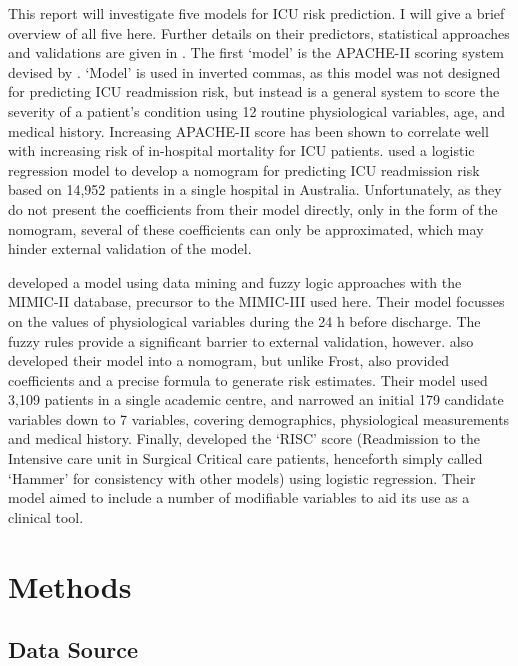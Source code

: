 \documentclass[onecolumn]{article}
\begin{document}
This report will investigate five models for ICU risk prediction. I will give a brief overview of all five here. Further details on their predictors, statistical approaches and validations are given in .
The first `model' is the APACHE-II scoring system devised by \cite{Knaus1985}. `Model' is used in inverted commas, as this model was not designed for predicting ICU readmission risk, but instead is a general system to score the severity of a patient's condition using 12 routine physiological variables, age, and medical history. Increasing APACHE-II score has been shown to correlate well with increasing risk of in-hospital mortality for ICU patients. 
\cite{Frost2010} used a logistic regression model to develop a nomogram for predicting ICU readmission risk based on 14,952 patients in a single hospital in Australia. Unfortunately, as they do not present the coefficients from their model directly, only in the form of the nomogram, several of these coefficients can only be approximated, which may hinder external validation of the model.

\cite{Fialho2012} developed a model using data mining and fuzzy logic approaches with the MIMIC-II database, precursor to the MIMIC-III used here. Their model focusses on the values of physiological variables during the 24 h before discharge. The fuzzy rules provide a significant barrier to external validation, however.
\cite{Martin2018} also developed their model into a nomogram, but unlike Frost, also provided coefficients and a precise formula to generate risk estimates. Their model used 3,109 patients in a single academic centre, and narrowed an initial 179 candidate variables down to 7 variables, covering demographics, physiological measurements and medical history.
Finally, \cite{Hammer2020} developed the `RISC' score (Readmission to the
Intensive care unit in Surgical Critical care patients, henceforth simply called `Hammer' for consistency with other models) using logistic regression. Their model aimed to include a number of modifiable variables to aid its use as a clinical tool.

\section{Methods}


\subsection{Data Source}
\end{document}
